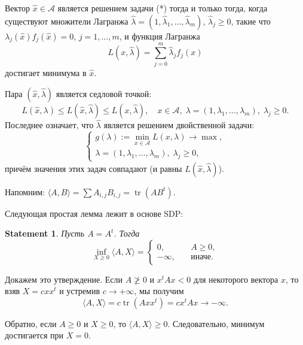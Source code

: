 \documentclass[handout]{beamer}
\renewcommand\le{\leqslant}
\renewcommand\ge{\geqslant}
\newtheorem*{statement}{Statement}
\DeclareMathOperator{\tr}{tr}
\begin{document}
\begin{frame}
    \begin{theorem}[KKT]
        Вектор $\hat x\in\mathcal A$ является решением задачи (*) тогда и только
        тогда, когда существуют множители Лагранжа $
        \hat\lambda=(1,\hat\lambda_1,\ldots,\hat\lambda_m)$, $
        \hat\lambda_j\ge 0$, такие что $\lambda_j(\hat x)f_j(\hat x)=0$,
        $j=1,\ldots,m$, и функция Лагранжа
        $$
        L(x,\hat\lambda)=\sum_{j=0}^m\hat\lambda_j f_j(x)
        $$
        достигает минимума в $\hat x$.
    \end{theorem}
    \pause

        Пара $(\hat x,\hat \lambda)$ является седловой точкой:
        $$
        L(\hat x,\lambda) \le L(\hat x,\hat\lambda) \le L(x,\hat\lambda),\quad x\in \mathcal
        A,\;\lambda=(1,\lambda_1,\ldots,\lambda_m),\;\lambda_j\ge 0.
        $$
    \pause
        Последнее означает, что $\hat\lambda$ является решением
        двойственной задачи:
        $$
        \begin{cases}
        g(\lambda):=\min_{x\in\mathcal A}L(x,\lambda)\to\max,\\
        \lambda=(1,\lambda_1,\ldots,\lambda_m),\;\lambda_j\ge 0,
        \end{cases}
        $$
        \pause
        причём значения этих задач совпадают (и равны $L(\hat
        x,\hat\lambda)$).
\end{frame}

\begin{frame}
    Напомним: $\langle A,B\rangle = \sum A_{i,j}B_{i,j} = \tr(AB^t)$.

        Следующая простая лемма лежит в основе SDP:

        \begin{statement}
            Пусть $A=A^t$. Тогда
        $$
            \displaystyle \inf_{X\ge 0}\langle A,X\rangle =
        \begin{cases}
            0,&\quad A\ge 0,\\
            -\infty,&\quad \mbox{иначе}.
        \end{cases}
            $$
        \end{statement}
    \pause\vspace{5pt}

        Докажем это утверждение. Если $A\not\ge 0$ и $x^tAx<0$ для
        некоторого вектора $x$, то взяв $X=cxx^t$ и устремив $
        c\to+\infty$, мы получим
        $$
        \langle A,X\rangle = c\tr(Axx^t) = c x^tAx \to -\infty.
        $$
    \pause\vspace{5pt}

        Обратно, если $A\ge0$ и $X\ge 0$, то $\langle
        A,X\rangle\ge 0$. Следовательно, минимум достигается при $
        X=0$.
\end{frame}
\end{document}
